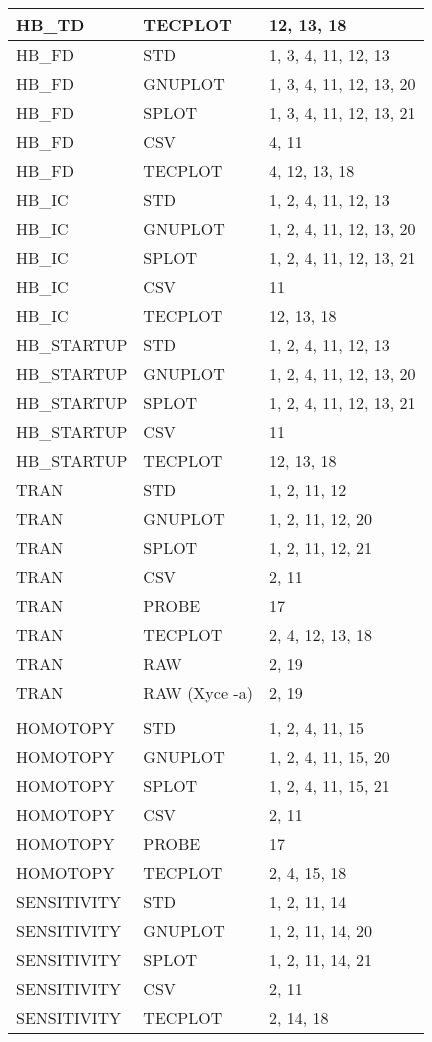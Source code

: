 {\begin{longtable}{>{\ttfamily\small}m{1in}<{\normalfont\small}>{\ttfamily\small}m{1.5in}<{\normalfont\footnotesize}m{2.25in}@{}}
HB\_TD & TECPLOT & 12, 13, 18 \\ \hline
HB\_FD & STD & 1, 3, 4, 11, 12, 13 \\ \hline
HB\_FD & GNUPLOT & 1, 3, 4, 11, 12, 13, 20 \\ \hline
HB\_FD & SPLOT & 1, 3, 4, 11, 12, 13, 21 \\ \hline
HB\_FD & CSV & 4, 11 \\ \hline
HB\_FD & TECPLOT & 4, 12, 13, 18 \\ \hline
HB\_IC & STD & 1, 2, 4, 11, 12, 13 \\ \hline
HB\_IC & GNUPLOT & 1, 2, 4, 11, 12, 13, 20 \\ \hline
HB\_IC & SPLOT & 1, 2, 4, 11, 12, 13, 21 \\ \hline
HB\_IC & CSV & 11 \\ \hline
HB\_IC & TECPLOT & 12, 13, 18 \\ \hline
HB\_STARTUP & STD & 1, 2, 4, 11, 12, 13 \\ \hline
HB\_STARTUP & GNUPLOT & 1, 2, 4, 11, 12, 13, 20 \\ \hline
HB\_STARTUP & SPLOT & 1, 2, 4, 11, 12, 13, 21 \\ \hline
HB\_STARTUP & CSV & 11 \\ \hline
HB\_STARTUP & TECPLOT & 12, 13, 18 \\ \hline
TRAN & STD & 1, 2, 11, 12 \\ \hline
TRAN & GNUPLOT & 1, 2, 11, 12, 20 \\ \hline
TRAN & SPLOT & 1, 2, 11, 12, 21 \\ \hline
TRAN & CSV & 2, 11 \\ \hline
TRAN & PROBE & 17 \\ \hline
TRAN & TECPLOT & 2, 4, 12, 13, 18 \\ \hline
TRAN & RAW & 2, 19 \\ \hline
TRAN & RAW (Xyce -a) & 2, 19 \\ \hline
\multicolumn{3}{c}{\smallskip\color{XyceDarkBlue}\em\bfseries Specialized Output Commands} \\
HOMOTOPY & STD & 1, 2, 4, 11, 15 \\ \hline
HOMOTOPY & GNUPLOT & 1, 2, 4, 11, 15, 20 \\ \hline
HOMOTOPY & SPLOT & 1, 2, 4, 11, 15, 21 \\ \hline
HOMOTOPY & CSV & 2, 11 \\ \hline
HOMOTOPY & PROBE & 17 \\ \hline
HOMOTOPY & TECPLOT & 2, 4, 15, 18 \\ \hline
SENSITIVITY & STD & 1, 2, 11, 14 \\ \hline
SENSITIVITY & GNUPLOT & 1, 2, 11, 14, 20 \\ \hline
SENSITIVITY & SPLOT & 1, 2, 11, 14, 21 \\ \hline
SENSITIVITY & CSV & 2, 11 \\ \hline
SENSITIVITY & TECPLOT & 2, 14, 18 \\ \hline
\end{longtable}
}

